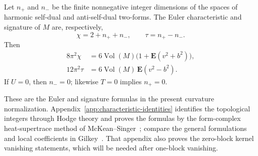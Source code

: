 \begin{proposition}
\label{prop:characteristic-identities}
Let $n_+$ and $n_-$ be the finite nonnegative integer dimensions of
the spaces of harmonic self-dual and anti-self-dual two-forms. The Euler
characteristic and signature of $M$ are, respectively,
\[
 \chi=2+n_++n_-,\qquad \tau=n_+-n_-.
\]
Then
\begin{equation}
 \begin{aligned}
 8\pi^2\chi
   &=6\operatorname{Vol}(M)
        \bigl(1+\mathbf E(v^2+b^2)\bigr),\\
 12\pi^2\tau
   &=6\operatorname{Vol}(M)\,\mathbf E(v^2-b^2).
 \end{aligned}
 \tag{6}\label{eq:6}
\end{equation}
If $U=0$, then $n_-=0$; likewise $T=0$ implies $n_+=0$.
\end{proposition}

These are the Euler and signature formulas in the present curvature
normalization. Appendix~\ref{app:characteristic-identities} identifies
the topological integers through Hodge theory and proves the formulas
by the form-complex heat-supertrace method of
McKean--Singer~\cite{McKeanSinger1967}; compare the general formulations
and local coefficients in Gilkey~\cite[Theorems~1.7.6 and
4.8.16]{Gilkey1984}. That appendix also proves the zero-block kernel
vanishing statements, which will be needed after one-block vanishing.
